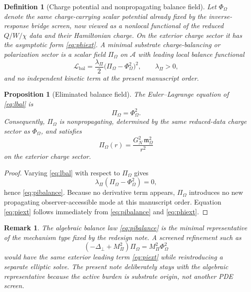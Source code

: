 \documentclass[11pt]{article}
\newcommand{\Sub}{\mathcal{A}}
\newcommand{\FlowPot}{\Phi_\Omega}
\newcommand{\BalanceField}{\Pi_\Omega}
\newcommand{\HamChargeOmega}{\mathfrak m_{\Omega}}
\newtheorem{definition}{Definition}
\newtheorem{proposition}{Proposition}
\newtheorem{remark}{Remark}
\begin{document}
\begin{definition}[Charge potential and nonpropagating balance field]
\label{def:balance}
Let \(\FlowPot\) denote the same charge-carrying scalar potential already fixed by the inverse-response bridge screen, now viewed as a nonlocal functional of the reduced \(Q/W/\chi\) data and their Hamiltonian charge. On the exterior charge sector it has the asymptotic form \eqref{eq:phiext}. A \emph{minimal substrate charge-balancing or polarization sector} is a scalar field \(\BalanceField\) on \(\Sub\) with leading local balance functional
\begin{equation}
\mathcal L_{\mathrm{bal}}
=
\frac{\lambda_\Pi}{2}\bigl(\BalanceField-\FlowPot^2\bigr)^2,
\qquad
\lambda_\Pi>0,
\label{eq:lbal}
\end{equation}
and no independent kinetic term at the present manuscript order.
\end{definition}

\begin{proposition}[Eliminated balance field]
\label{prop:eliminate}
The Euler--Lagrange equation of \eqref{eq:lbal} is
\begin{equation}
\BalanceField=\FlowPot^2.
\label{eq:pibalance}
\end{equation}
Consequently, \(\BalanceField\) is nonpropagating, determined by the same reduced-data charge sector as \(\FlowPot\), and satisfies
\begin{equation}
\BalanceField(r)=\frac{G_N^2\,\HamChargeOmega^2}{r^2}
\label{eq:piext}
\end{equation}
on the exterior charge sector.
\end{proposition}

\begin{proof}
Varying \eqref{eq:lbal} with respect to \(\BalanceField\) gives
\[
\lambda_\Pi(\BalanceField-\FlowPot^2)=0,
\]
hence \eqref{eq:pibalance}. Because no derivative term appears, \(\BalanceField\) introduces no new propagating observer-accessible mode at this manuscript order. Equation \eqref{eq:piext} follows immediately from \eqref{eq:pibalance} and \eqref{eq:phiext}.
\end{proof}

\begin{remark}
The algebraic balance law \eqref{eq:pibalance} is the minimal representative of the mechanism type fixed by the redesign note. A screened refinement such as
\[
(-\Delta_\perp+M_\Pi^2)\BalanceField=M_\Pi^2\FlowPot^2
\]
would have the same exterior leading term \eqref{eq:piext} while reintroducing a separate elliptic solve. The present note deliberately stays with the algebraic representative because the active burden is substrate origin, not another PDE screen.
\end{remark}
\end{document}

